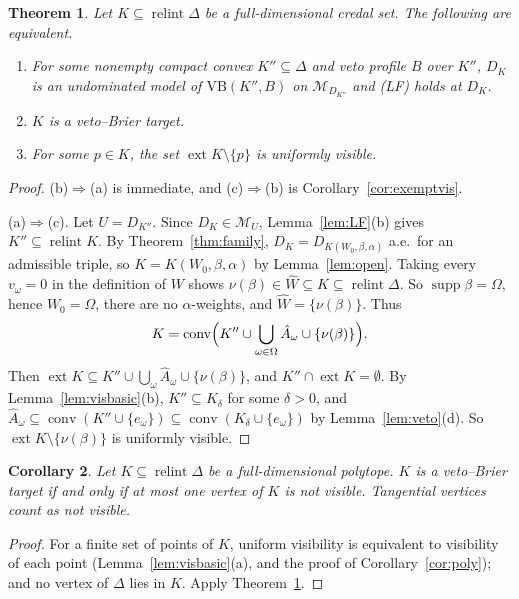 \documentclass[11pt]{article}
\newcommand{\M}{\mathcal{M}}
\newcommand{\VB}{\mathrm{VB}}
\DeclareMathOperator{\conv}{conv}
\DeclareMathOperator{\relint}{relint}
\DeclareMathOperator{\supp}{supp}
\DeclareMathOperator{\ext}{ext}
\theoremstyle{plain}
\newtheorem{theorem}{Theorem}[section]
\newtheorem{corollary}[theorem]{Corollary}
\theoremstyle{definition}
\theoremstyle{remark}
\begin{document}
\begin{theorem}\label{thm:reach}
Let $K\subseteq\relint\Delta$ be a full-dimensional credal set. The following are
equivalent.
\begin{enumerate}[label=(\alph*)]
  \item For some nonempty compact convex $K''\subseteq\Delta$ and veto profile $B$ over
  $K''$, $D_K$ is an undominated model of $\VB(K'',B)$ on $\M_{D_{K''}}$ and (LF) holds at
  $D_K$.
  \item $K$ is a veto--Brier target.
  \item For some $p\in K$, the set $\ext K\setminus\{p\}$ is uniformly visible.
\end{enumerate}
\end{theorem}

\begin{proof}
(b)$\Rightarrow$(a) is immediate, and (c)$\Rightarrow$(b) is
Corollary~\ref{cor:exemptvis}.

(a)$\Rightarrow$(c). Let $U=D_{K''}$. Since $D_K\in\M_U$, Lemma~\ref{lem:LF}(b) gives
$K''\subseteq\relint K$. By Theorem~\ref{thm:family}, $D_K=D_{K(W_0,\beta,\alpha)}$ a.e.\
for an admissible triple, so $K=K(W_0,\beta,\alpha)$ by Lemma~\ref{lem:open}. Taking every
$v_\omega=0$ in the definition of $W$ shows $\nu(\beta)\in\hat W\subseteq K\subseteq
\relint\Delta$. So $\supp\beta=\Omega$, hence $W_0=\Omega$, there are no
$\alpha$-weights, and $\hat W=\{\nu(\beta)\}$. Thus
\[
  K=\conv\Bigl(K''\cup\bigcup_{\omega\in\Omega}\hat A_\omega\cup\{\nu(\beta)\}\Bigr).
\]
Then $\ext K\subseteq K''\cup\bigcup_\omega\hat A_\omega\cup\{\nu(\beta)\}$, and
$K''\cap\ext K=\emptyset$. By Lemma~\ref{lem:visbasic}(b), $K''\subseteq K_\delta$ for some
$\delta>0$, and $\hat A_\omega\subseteq\conv(K''\cup\{e_\omega\})\subseteq\conv(K_\delta
\cup\{e_\omega\})$ by Lemma~\ref{lem:veto}(d). So $\ext K\setminus\{\nu(\beta)\}$ is
uniformly visible.
\end{proof}

\begin{corollary}\label{cor:polyreach}
Let $K\subseteq\relint\Delta$ be a full-dimensional polytope. $K$ is a veto--Brier target
if and only if at most one vertex of $K$ is not visible. Tangential vertices count as not
visible.
\end{corollary}

\begin{proof}
For a finite set of points of $K$, uniform visibility is equivalent to visibility of each
point (Lemma~\ref{lem:visbasic}(a), and the proof of Corollary~\ref{cor:poly}); and no
vertex of $\Delta$ lies in $K$. Apply Theorem~\ref{thm:reach}.
\end{proof}
\end{document}
